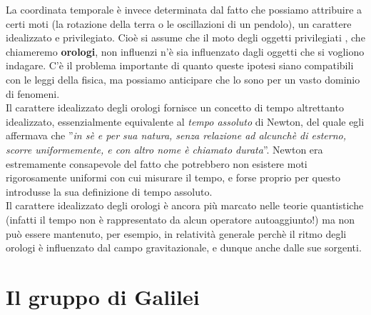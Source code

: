 \documentclass[a4paper,11pt]{book}
\theoremstyle{plain}
\theoremstyle{definition}
\begin{document}
La coordinata temporale è invece determinata dal fatto che possiamo attribuire a certi 
moti (la rotazione della terra o le oscillazioni di un pendolo), un carattere idealizzato e 
privilegiato. Cioè si assume che il moto degli oggetti privilegiati , che chiameremo \textbf{orologi}, 
non influenzi n'è sia influenzato dagli oggetti che si vogliono indagare. C'è il problema 
importante di quanto queste ipotesi siano compatibili con le leggi della fisica, ma possiamo 
anticipare che lo sono per un vasto dominio di fenomeni. \\
Il carattere idealizzato degli orologi fornisce un concetto di tempo altrettanto idealizzato, 
essenzialmente equivalente al \emph{tempo assoluto} di Newton, del quale egli affermava che 
''\emph{in sè e per sua natura, senza relazione ad alcunchè di esterno, scorre uniformemente, e 
con altro nome è chiamato durata}''. Newton era estremamente consapevole del fatto che 
potrebbero non esistere moti rigorosamente uniformi con cui misurare il tempo, e forse 
proprio per questo introdusse la sua definizione di tempo assoluto. \\
Il carattere idealizzato degli orologi è ancora più marcato nelle teorie quantistiche (infatti il tempo non è rappresentato da alcun operatore autoaggiunto!) ma non può essere mantenuto, per esempio, in relatività generale perchè il ritmo degli orologi è 
influenzato dal campo gravitazionale, e dunque anche dalle sue sorgenti. 

\section{Il gruppo di Galilei}
\end{document}
